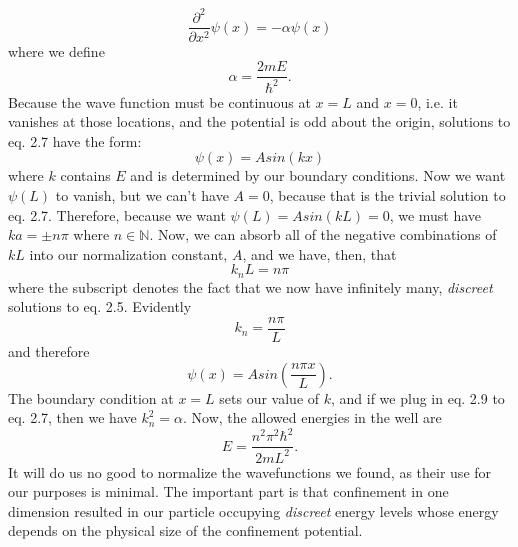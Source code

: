 \begin{equation} \label{tise}
\frac{\partial^2}{\partial x^2} \psi(x) = - \alpha \psi(x)
\end{equation}
where we define 
\begin{equation}
\alpha = \frac{2mE}{\hbar^2}.
\end{equation}
Because the wave function must be continuous at $x = L$ and $ x = 0$, i.e. it vanishes at those locations, and the potential is odd about the origin,  solutions to eq. 2.7 have the form:
\begin{equation} \label{soln1}
\psi(x) = A sin(k x) 
\end{equation}
where $k$ contains $E$ and is determined by our boundary conditions. Now we want $\psi(L)$ to vanish, but we can't have $A =0$, because that is the trivial solution to eq. 2.7. Therefore, because we want $\psi(L) = Asin(k L) = 0 $, we must have $ka = \pm n \pi$ where $n \in \mathbb{N}$. Now, we can absorb all of the negative combinations of $k L$ into our normalization constant, $A$, and we have, then, that 
\begin{equation}
k_n L = n \pi 
\end{equation}
where the subscript denotes the fact that we now have infinitely many, \textit{discreet} solutions to eq. 2.5. Evidently 
\begin{equation}
k_n = \frac{ n \pi}{L}
\end{equation}
and therefore
\begin{equation}
\psi(x) = A sin(\frac{n \pi x}{L}).
\end{equation}
The boundary condition at $x=L$ sets our value of $k$, and if we plug in eq. 2.9 to eq. 2.7, then we have $k_n^{2} = \alpha$. Now, the allowed energies in the well are 
\begin{equation}
E = \frac{n^2 \pi^2 \hbar^2}{2 m L^2}.
\end{equation}
It will do us no good to normalize the wavefunctions we found, as their use for our purposes is minimal. The important part is that confinement in one dimension resulted in our particle occupying \textit{discreet} energy levels whose energy depends on the physical size of the confinement potential. 

